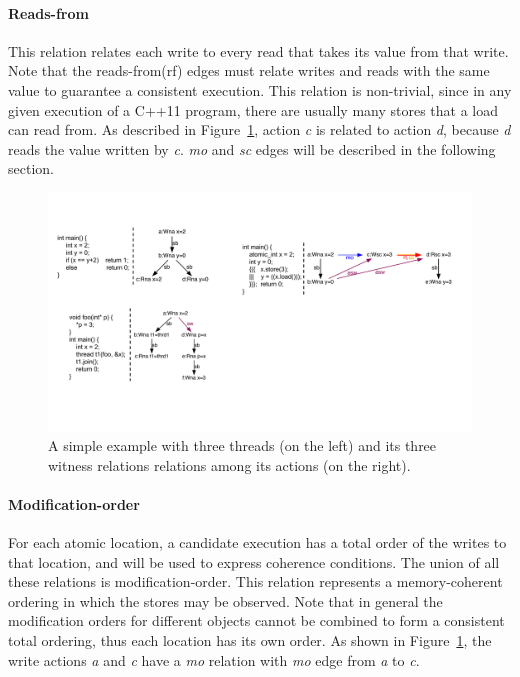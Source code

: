 \documentclass[preprint, numbers, 10pt]{sigplanconf}
\begin{document}
\paragraph{Reads-from}

This relation relates each write to every read that takes its value 
from that write. Note that the reads-from(rf) edges must relate writes 
and reads with the same value to guarantee a consistent execution. 
This relation is non-trivial, since in any given execution of a C++11 program, 
there are usually many stores that a load can read from. As described in
Figure~\ref{fig:rf_relation}, action \textit{c} is related to action \textit{d},
because \textit{d} reads the value written by \textit{c}. \textit{mo} and 
\textit{sc} edges will be described in the following section.  

\begin{figure}%
\centering\includegraphics[scale=0.5]{rf_Relation.pdf} %
\caption{A simple example with three threads (on the left) and 
its three witness relations relations among its actions (on the right).}
\label{fig:rf_relation}
\end{figure}

\paragraph{Modification-order}

For each atomic location, a candidate execution has a total order 
of the writes to that location, and will be used to express coherence conditions. 
The union of all these relations 
is modification-order. This relation represents a memory-coherent
ordering in which the stores may be observed. 
Note that in general the modification orders for different objects 
cannot be combined to form a consistent total ordering, 
thus each location has its own order. As shown in Figure~\ref{fig:rf_relation},
the write actions \textit{a} and \textit{c} have a \textit{mo} relation with
\textit{mo} edge from \textit{a} to \textit{c}. 
\end{document}
